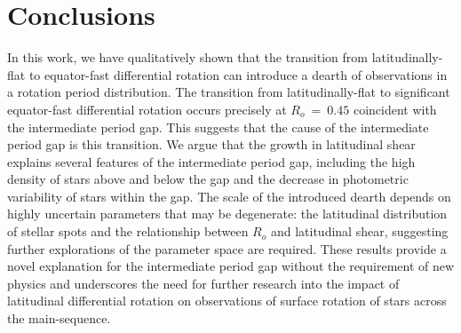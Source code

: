 \section{Conclusions}
\label{sec:conclusione}

In this work, we have qualitatively shown that the transition from latitudinally-flat to equator-fast differential rotation can introduce a dearth of observations in a rotation period distribution.
The transition from latitudinally-flat to significant equator-fast differential rotation occurs precisely at $R_o \ = \ 0.45$ coincident with the intermediate period gap.
This suggests that the cause of the intermediate period gap is this transition.
We argue that the growth in latitudinal shear explains several features of the intermediate period gap, including the high density of stars above and below the gap and the decrease in photometric variability of stars within the gap.
The scale of the introduced dearth depends on highly uncertain parameters that may be degenerate: the latitudinal distribution of stellar spots and the relationship between $R_o$ and latitudinal shear, suggesting further explorations of the parameter space are required.
These results provide a novel explanation for the intermediate period gap without the requirement of new physics and underscores the need for further research into the impact of latitudinal differential rotation on observations of surface rotation of stars across the main-sequence.
